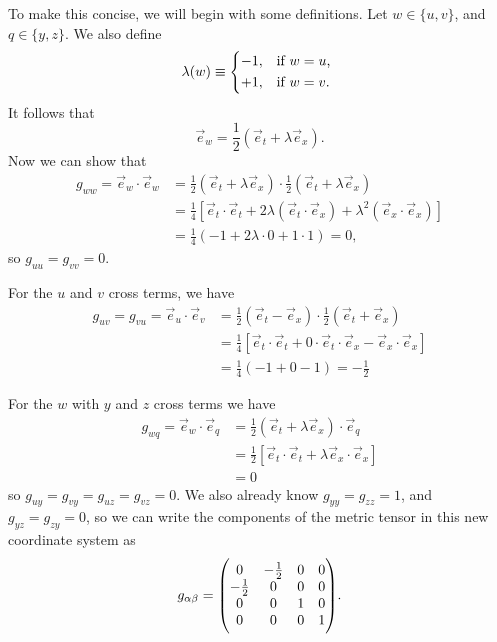 \documentclass[gr-notes.tex]{subfiles}
\begin{document}
To make this concise, we will begin with some definitions. Let $w \in \{ u, v \}$, and $q \in \{ y, z \}$. We also define
%
\begin{displaymath}
  \lambda(w) \equiv
  \begin{dcases*}
    -1, & if $w = u$,
    \\
    +1, & if $w = v$.
  \end{dcases*}
\end{displaymath}
%
It follows that
%
\begin{displaymath}
  \vec{e}_w = \frac{1}{2} (\vec{e}_t + \lambda \vec{e}_x).
\end{displaymath}
%
Now we can show that
%
\begin{align*}
  g_{ww} =
  \vec{e}_w \cdot \vec{e}_w &=
  \frac{1}{2} (\vec{e}_t + \lambda \vec{e}_x) \cdot
  \frac{1}{2} (\vec{e}_t + \lambda \vec{e}_x)
  \\ &=
  \frac{1}{4} [
    \vec{e}_t \cdot \vec{e}_t +
    2 \lambda (\vec{e}_t \cdot \vec{e}_x) +
    \lambda^2 (\vec{e}_x \cdot \vec{e}_x)
  ]
  \\ &=
  \frac{1}{4} (
    -1 + 2 \lambda \cdot 0 + 1 \cdot 1
  ) =
  0,
\end{align*}
%
so $g_{uu} = g_{vv} = 0$.

For the $u$ and $v$ cross terms, we have
%
\begin{align*}
  g_{uv} = g_{vu} =
  \vec{e}_u \cdot \vec{e}_v &=
  \frac{1}{2} (\vec{e}_t - \vec{e}_x) \cdot
  \frac{1}{2} (\vec{e}_t + \vec{e}_x)
  \\ &=
  \frac{1}{4} [
    \vec{e}_t \cdot \vec{e}_t +
    0 \cdot \vec{e}_t \cdot \vec{e}_x -
    \vec{e}_x \cdot \vec{e}_x
  ]
  \\ &=
  \frac{1}{4} ( -1 + 0 - 1 ) =
  -\frac{1}{2}
\end{align*}

For the $w$ with $y$ and $z$ cross terms we have
%
\begin{align*}
  g_{wq} =
  \vec{e}_w \cdot \vec{e}_q &=
  \frac{1}{2} (\vec{e}_t + \lambda \vec{e}_x) \cdot \vec{e}_q
  \\ &=
  \frac{1}{2} [ \vec{e}_t \cdot \vec{e}_t + \lambda \vec{e}_x \cdot \vec{e}_x ]
  \\ &=
  0
\end{align*}
%
so $g_{uy} = g_{vy} = g_{uz} = g_{vz} = 0$. We also already know $g_{yy} = g_{zz} = 1$, and $g_{yz} = g_{zy} = 0$, so we can write the components of the metric tensor in this new coordinate system as
%
\begin{displaymath}
  g_{\alpha\beta} =
  \mqty(
               0 & -\frac{1}{2} & 0 & 0 \\
    -\frac{1}{2} &            0 & 0 & 0 \\
               0 &            0 & 1 & 0 \\
               0 &            0 & 0 & 1
  ).
\end{displaymath}
\end{document}
